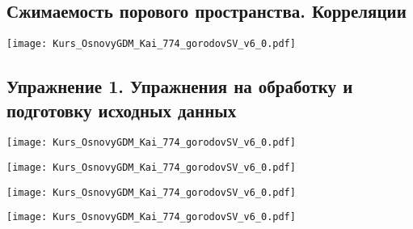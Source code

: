 \documentclass[main.tex]{subfiles}
\begin{document}
\subsection{Сжимаемость порового пространства. Корреляции}

\texttt{[image: Kurs\_OsnovyGDM\_Kai\_774\_gorodovSV\_v6\_0.pdf]}

\subsection{Упражнение 1. Упражнения на обработку и подготовку исходных данных}

\texttt{[image: Kurs\_OsnovyGDM\_Kai\_774\_gorodovSV\_v6\_0.pdf]}

\texttt{[image: Kurs\_OsnovyGDM\_Kai\_774\_gorodovSV\_v6\_0.pdf]}

\texttt{[image: Kurs\_OsnovyGDM\_Kai\_774\_gorodovSV\_v6\_0.pdf]}

\texttt{[image: Kurs\_OsnovyGDM\_Kai\_774\_gorodovSV\_v6\_0.pdf]}
\end{document}
